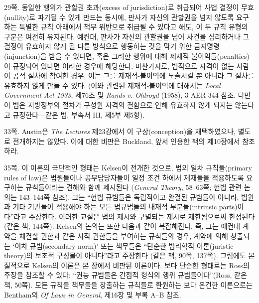 {\noteentry 29쪽.  동일한 행위가 관할권 초과(excess of
jurisdiction)로 취급되어 사법 결정이 무효(nullity)로 파기될 수 있게
만드는 동시에, 판사가 자신의 관할권을 넘지 않도록 요구하는 특별한 규칙
아래에서 책무 위반으로 취급될 수 있다고 해도, 이 두 규칙 유형의 구분은
여전히 유지된다. 예컨대, 판사가 자신의 관할권을 넘어 사건을 심리하거나
그 결정이 유효하지 않게 될 다른 방식으로 행동하는 것을 막기 위한
금지명령(injunction)을 받을 수 있다면, 혹은 그러한 행위에 대해
제재적-불이익들(penalties)이 규정되어 있다면 이러한 경우에 해당한다.
마찬가지로, 법적으로 자격이 없는 사람이 공적 절차에 참여한 경우, 이는
그를 제재적-불이익에 노출시킬 뿐 아니라 그 절차를 유효하지 않게 만들 수
있다. (이와 관련된 제재적-불이익에 대해서는 \emph{Local Government Act
1933}, 제76조 및 \emph{Rands v. Oldroyd} (1958), 3 AER 344 참조. 다만 이
법은 지방정부의 절차가 구성원 자격의 결함으로 인해 유효하지 않게 되지는
않는다고 규정한다---같은 법, 부속서 III, 제5부 제5항).

\noteentry 33쪽.  Austin은 \emph{The
Lectures} 제23강에서 이 구상(conception)을 채택하였으나, 별도로
전개하지는 않았다. 이에 대한 비판은 Buckland, 앞서 인용한 책의
제10장에서 참조하라.

\noteentry 35쪽.  이
이론의 극단적인 형태는 Kelsen이 전개한 것으로, 법의 일차 규칙들(primary
rules of law)은 법원들이나 공무담당자들이 일정 조건 하에서 제재들을
적용하도록 요구하는 규칙들이라는 견해와 함께 제시된다 (\emph{General
Theory}, 58--63쪽; 헌법 관련 논의는 143--144쪽 참조). 그는 “헌법
규범들은 독립적이고 완결된 규범들이 아니라, 법원과 기타 기관들이
적용해야 하는 모든 법규범들의 내재적 부분들(intrinsic parts)이다”라고
주장한다. 이러한 교설은 법의  제시와 구별되는
 제시로 제한됨으로써 한정된다 (같은 책, 144쪽).
Kelsen의 논의는 또한 다음과 같이 복잡해진다. 즉, 그는 예컨대 계약을
체결할 권한과 같은 사적 권한들을 부여하는 규칙들의 경우, 계약에 의해
창출되는 ‘이차 규범(secondary norm)’ 또는 책무들은 “단순한 법리학적
이론(juristic theory)의 보조적 구성물이 아니다”라고 주장한다 (같은 책,
90쪽, 137쪽). 그럼에도 본질적으로 Kelsen의 이론은 본 장에서 비판된
이론이다. 보다 단순한 형태로는 Ross의 주장을 참조할 수 있다: “권능
규범들은 간접적 형식의 행위 규범들이다”(Ross, 같은 책, 50쪽). 모든
규칙을 책무들을 창출하는 규칙들로 환원하는 보다 온건한 이론으로는
Bentham의 \emph{Of Laws in General}, 제16장 및 부록 A--B 참조.

}
